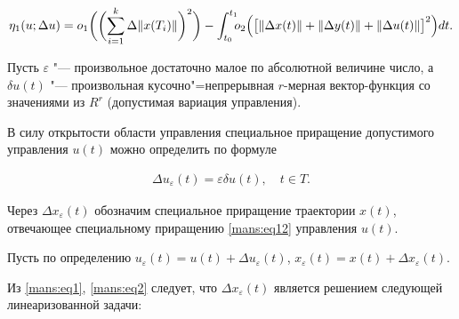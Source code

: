 $$

\eta_{1} (u;  \Delta u)= o_{1} \biggl( \biggl( \sum_{i=1}^{k} \Delta \Vert x(T_{i}) \Vert  \biggr)^{2} \biggr) -\int_{t_{0}}^{t_{1}} \!\!\! o_{2} \Bigl( \bigl[\Vert \Delta x(t) \Vert +\Vert \Delta y(t) \Vert+\Vert \Delta u(t) \Vert \bigr]^{2} \Bigr) dt .

$$



Пусть $ \varepsilon $ "--- произвольное достаточно малое по абсолютной величине число, а $ \delta u(t) $ "--- произвольная кусочно"=непрерывная  $ r $-мерная вектор-функция со значениями из $ R^{r} $  (допустимая вариация управления).



В силу открытости области управления специальное приращение допустимого управления $ u(t) $  можно определить по формуле

\begin{gather}

\label{mans:eq12}

\Delta u_{\varepsilon}(t)=\varepsilon \delta u(t) ,   \quad  t \in T.

\end{gather}



Через $ \Delta x_{\varepsilon}(t) $   обозначим специальное приращение траектории  $ x(t) $, отвечающее специальному приращению \eqref{mans:eq12} управления  $ u(t) $.



Пусть по определению  $ u_{\varepsilon}(t)=u(t)+ \Delta u_{\varepsilon}(t) $,  $ x_{\varepsilon}(t)=x(t)+ \Delta x_{\varepsilon}(t) $.



Из \eqref{mans:eq1}, \eqref{mans:eq2} следует, что $ \Delta x_{\varepsilon}(t) $  является решением следующей линеаризованной задачи:

